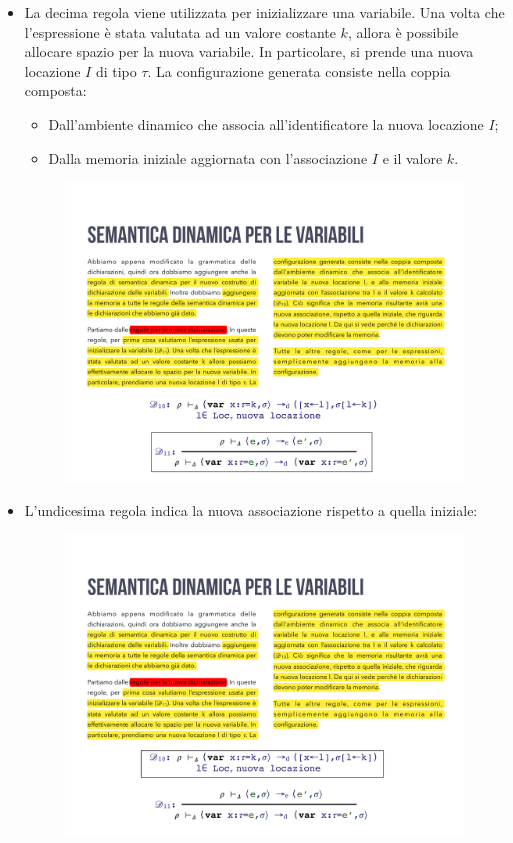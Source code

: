 \documentclass[a4paper]{article}
\begin{document}
\begin{itemize}
 		\item La decima regola viene utilizzata per inizializzare una variabile. Una volta che l'espressione è stata valutata ad un valore costante $k$, allora è possibile allocare spazio per la nuova variabile. In particolare, si prende una nuova locazione $I$ di tipo $\tau$. La configurazione generata consiste nella coppia composta:
 		\begin{itemize}
 			\item Dall'ambiente dinamico che associa all'identificatore la nuova locazione $I$;
 			\item Dalla memoria iniziale aggiornata con l'associazione $I$ e il valore $k$.
 		\end{itemize}
 		\begin{figure}[!htp]
 			\centering
 			\includegraphics[width=\textwidth]{img/regola_dichiarazione-up-010.pdf}
 		\end{figure}
 		
 		\item L'undicesima regola indica la nuova associazione rispetto a quella iniziale:
 		\begin{figure}[!htp]
 			\centering
 			\includegraphics[width=.9\textwidth]{img/regola_dichiarazione-up-011.pdf}
 		\end{figure}
 	\end{itemize}\newpage
 	
\end{document}
